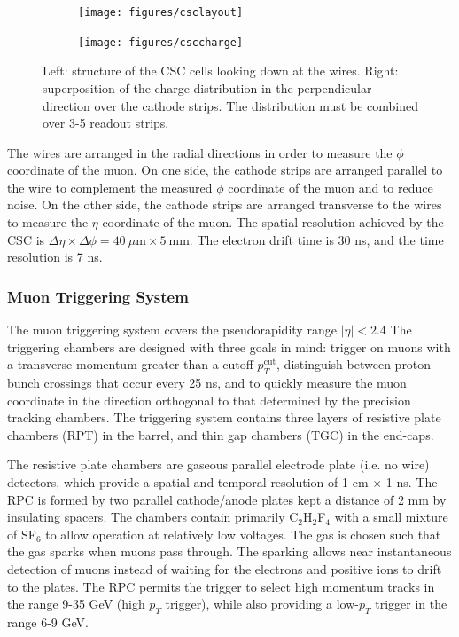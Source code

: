 \begin{figure}[!hbpt]
  \centering
  \begin{subfigure}[b]{0.45\textwidth}
      \texttt{[image: figures/csclayout]}
      \caption{}
      \label{fig:csclayout}
  \end{subfigure}
  \quad\quad\quad
  \begin{subfigure}[b]{0.45\textwidth}
  \centering
    \texttt{[image: figures/csccharge]}
    \caption{}
    \label{fig:csccharge}
  \end{subfigure}
  \caption{Left: structure of the CSC cells looking down at the wires. 
  Right: superposition of the charge distribution in the perpendicular direction
  over the cathode strips. The distribution must be combined over 3-5 readout strips.}
  \label{fig:csc}
\end{figure}

The wires are arranged in the radial directions in order to measure the $\phi$
coordinate of the muon. On one side, the cathode strips are arranged parallel to 
the wire to complement the measured $\phi$ coordinate of the muon and to reduce noise.
On the other side, the cathode strips are arranged transverse to the wires to measure
the $\eta$ coordinate of the muon. The spatial resolution achieved by the CSC
is $\Delta \eta \times \Delta \phi = 40~\mu\mathrm{m} \times 5~\mathrm{mm}$.
The electron drift time is 30 ns, and the time resolution is 7 ns.

\subsubsection*{Muon Triggering System}
The muon triggering system covers the pseudorapidity range $|\eta| < 2.4$  The
triggering chambers are designed with three goals in mind: trigger on muons with 
a transverse momentum greater than a cutoff $p_T^{\text{cut}}$, distinguish
between proton bunch crossings that occur every 25 ns, and to quickly measure the 
muon coordinate in the direction orthogonal to that determined by the 
precision tracking chambers. The triggering system contains three layers of
resistive plate chambers (RPT) in the barrel, and thin gap chambers (TGC) 
in the end-caps.

The resistive plate chambers are gaseous parallel electrode plate (i.e. no wire)
detectors, which provide a spatial and temporal resolution of 1 cm $\times$ 1 ns.
The RPC is formed by two parallel cathode/anode plates kept a distance of 2 mm by
insulating spacers. The chambers contain primarily C$_2$H$_2$F$_4$ with a
small mixture of SF$_6$ to allow operation at relatively low voltages.
The gas is chosen such that the gas sparks when muons pass through. The sparking
allows near instantaneous detection of muons instead of waiting for the electrons
and positive ions to drift to the plates. The RPC permits the trigger to select
high momentum tracks in the range 9-35 GeV (high $p_T$ trigger), while
also providing a low-$p_T$ trigger in the range 6-9 GeV.

